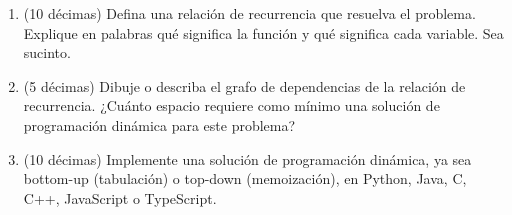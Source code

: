 
\begin{enumerate}
  \item (10 décimas) Defina una relación de recurrencia que resuelva el problema. Explique en palabras qué significa la función y qué significa cada variable. Sea sucinto.
  \item (5 décimas) Dibuje o describa el grafo de dependencias de la relación de recurrencia. ¿Cuánto espacio requiere como mínimo una solución de programación dinámica para este problema?
  \item (10 décimas) Implemente una solución de programación dinámica, ya sea bottom-up (tabulación) o top-down (memoización), en Python, Java, C, C++, JavaScript o TypeScript.
\end{enumerate}

\bigskip
